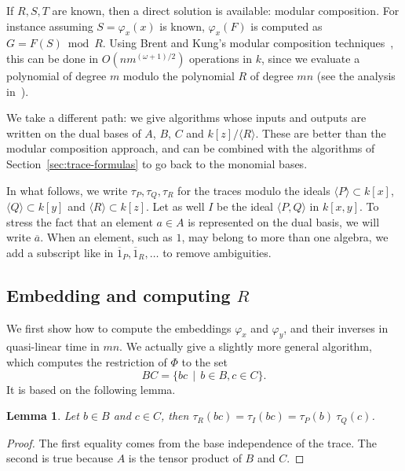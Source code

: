 \documentclass[12pt]{article}
\newcommand{\ang}[1]{\langle#1\rangle}
\newcommand{\dual}[1]{\overline{#1}}
\newtheorem{Lemma}{Lemma}
\begin{document}
If $R,S,T$ are known, then a direct solution is available: modular
composition. For instance assuming $S=\varphi_x(x)$ is known,
$\varphi_x(F)$ is computed as $G=F(S) \bmod R$. Using Brent and Kung's
modular composition techniques~\cite{brent+kung}, this can be done in
$O(n m^{(\omega+1)/2})$ operations in $k$, since we evaluate a
polynomial of degree $m$ modulo the polynomial $R$ of degree $mn$ (see
the analysis in~\cite{shoup94}).

We take a different path: we give algorithms whose inputs and outputs
are written on the dual bases of $A$, $B$, $C$ and
$k[z]/\ang{R}$. These are better than the modular composition
approach, and can be combined with the algorithms of
Section~\ref{sec:trace-formulas} to go back to the monomial bases.

In what follows, we write $\tau_P,\tau_Q,\tau_R$ for the traces modulo
the ideals $\langle P\rangle\subset k[x]$, $\langle Q \rangle \subset
k[y]$ and $\langle R \rangle \subset k[z]$. Let as well $I$ be the
ideal $\langle P, Q\rangle$ in $k[x,y]$. To stress the fact that an
element $a\in A$ is represented on the dual basis, we will write
$\dual{a}$. When an element, such as $1$, may belong to more than one
algebra, we add a subscript like in $\dual{1}_P, \dual{1}_R, \dots$ to
remove ambiguities.




\subsection{Embedding and computing $R$} 

We first show how to compute the embeddings $\varphi_x$ and
$\varphi_y$, and their inverses in quasi-linear time in $mn$. We
actually give a slightly more general algorithm, which computes the
restriction of $\Phi$ to the set $$BC = \{bc \,\mid\, b\in B, c\in
C\}.$$
It is based on the following lemma.

\begin{Lemma}
  \label{lemma:traces:PQR}
  Let $b\in B$ and $c \in C$, then $\tau_R(bc) = \tau_I(bc) =
  \tau_P(b) \ \tau_Q(c)$.
\end{Lemma}
\begin{proof}
  The first equality comes from the base independence of the
  trace. The second is true because $A$ is the tensor product of $B$
  and $C$.
\end{proof}
\end{document}
